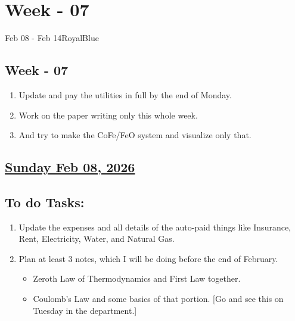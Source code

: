 \section{Week - 07}
\begin{physicsmodule}{Feb 08 - Feb 14}{RoyalBlue}
  \begin{lawbox}
    \subsection*{\sffamily\bfseries Week - 07}
    \begin{enumerate}
    \item Update and pay the utilities in full by the end of Monday.
    \item Work on the paper writing only this whole week.
    \item And try to make the CoFe/FeO system and visualize only that.
\end{enumerate}
  \end{lawbox}
\end{physicsmodule}
\subsection*{\underline{Sunday Feb 08, 2026}}
\subsection*{To do Tasks:}
\begin{enumerate}
    \item Update the expenses and all details of the auto-paid things like Insurance, Rent, Electricity, Water, and Natural Gas. 
    \item Plan at least 3 notes, which I will be doing before the end of February.
    \begin{itemize}
        \item Zeroth Law of Thermodynamics and First Law together.
        \item Coulomb's Law and some basics of that portion. [Go and see this on Tuesday in the  department.]
    \end{itemize} 
\end{enumerate}
